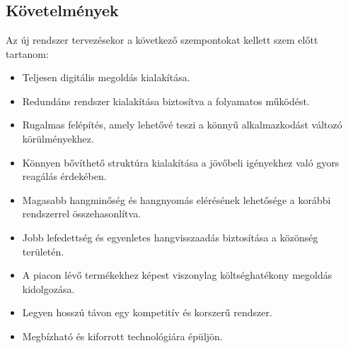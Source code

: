 \chapter{\SystemDesign}
\section{Követelmények}
Az új rendszer tervezésekor a következő szempontokat kellett szem előtt tartanom:
\begin{itemize}
	\item Teljesen digitális megoldás kialakítása.
	\item Redundáns rendszer kialakítása biztosítva a folyamatos működést.
	\item Rugalmas felépítés, amely lehetővé teszi a könnyű alkalmazkodást változó körülményekhez.
	\item Könnyen bővíthető struktúra kialakítása a jövőbeli igényekhez való gyors reagálás érdekében.
	\item Magasabb hangminőség és hangnyomás elérésének lehetősége a korábbi rendszerrel összehasonlítva.
	\item Jobb lefedettség és egyenletes hangvisszaadás biztosítása a közönség területén.
	\item A piacon lévő termékekhez képest viszonylag költséghatékony megoldás kidolgozása.
	\item Legyen hosszú távon egy kompetitív és korszerű rendszer.
	\item Megbízható és kiforrott technológiára épüljön.
\end{itemize}
